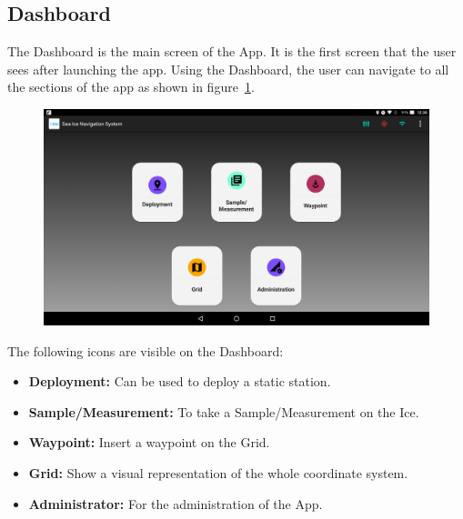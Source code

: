 \subsection{Dashboard}
\label{subsec:subsec7_1_1}
\noindent
The Dashboard is the main screen of the App. It is the first screen that the user sees after launching the app. Using the Dashboard, the user can navigate to all the sections of the app as shown in figure~\ref{fig:CH7MainDashboard}.
%
\begin{figure}[h]
	\centering
	\includegraphics[height=0.3\textheight]{fig07/MainDashboard}
	\label{fig:CH7MainDashboard}
\end{figure}
\newline
\noindent
The following icons are visible on the Dashboard:
\begin{itemize}
	\item \textbf{Deployment:} Can be used to deploy a static station. 
	\item \textbf{Sample/Measurement:} To take a Sample/Measurement on the Ice.
	\item \textbf{Waypoint:} Insert a waypoint on the Grid. 
	\item \textbf{Grid:} Show a visual representation of the whole coordinate system.
	\item \textbf{Administrator:} For the administration of the App. 
\end{itemize}
%
